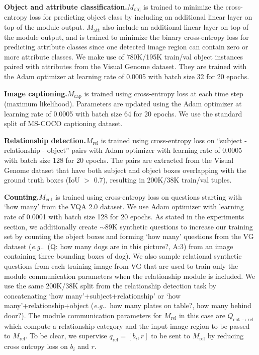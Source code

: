 \documentclass{article}
\makeatletter
\def\Mobj{M_\mathrm{obj}}
\def\Matt{M_\mathrm{att}}
\def\Mrel{M_\mathrm{rel}}
\def\Mcnt{M_\mathrm{cnt}}
\def\Mcap{M_\mathrm{cap}}
\DeclareRobustCommand\onedot{\futurelet\@let@token\@onedot}
\def\@onedot{\ifx\@let@token.\else.\null\fi\xspace}
\def\eg{\emph{e.g}\onedot} \def\Eg{\emph{E.g}\onedot}
\makeatother
\begin{document}
\textbf{Object and attribute classification.}$\Mobj$ is trained to minimize the cross-entropy loss for predicting object class by including an additional linear layer on top of the module output.
$\Matt$ also include an additional linear layer on top of the module output, and is trained to minimize the binary cross-entropy loss for predicting attribute classes since one detected image region can contain zero or more attribute classes. We make use of 780K/195K train/val object instances paired with attributes from the Visual Genome dataset.
They are trained with the Adam optimizer at learning rate of 0.0005 with batch size 32 for 20 epochs.

\textbf{Image captioning.}$\Mcap$ is trained using cross-entropy loss at each time step (maximum likelihood).
Parameters are updated using the Adam optimizer at learning rate of 0.0005 with batch size 64 for 20 epochs.
We use the standard split of MS-COCO captioning dataset.

\textbf{Relationship detection.}$\Mrel$ is trained using cross-entropy loss on ``subject - relationship - object'' pairs with Adam optimizer with learning rate of 0.0005 with batch size 128 for 20 epochs. The pairs are extracted from the Visual Genome dataset that have both subject and object boxes overlapping with the ground truth boxes (IoU $>$ 0.7), resulting in 200K/38K train/val tuples.

\textbf{Counting.}$\Mcnt$ is trained using cross-entropy loss on questions starting with `how many' from the VQA 2.0 dataset. We use Adam optimizer with learning rate of 0.0001 with batch size 128 for 20 epochs.
As stated in the experiments section, we additionally create $\sim$89K synthetic questions to increase our training set by counting the object boxes and forming `how many' questions from the VG dataset (\eg~(Q: how many dogs are in this picture?, A:3) from an image containing three bounding boxes of dog).
We also sample relational synthetic questions from each training image from VG that are used to train only the module communication parameters when the relationship module is included.
We use the same 200K/38K split from the relationship detection task by concatenating `how many'+subject+relationship' or `how many'+relationship+object (\eg~how many plates on table?, how many behind door?).
The module communication parameters for $\Mrel$ in this case are $Q_{\mathrm{cnt}\rightarrow\mathrm{rel}}$ which compute a relationship category and the input image region to be passed to $\Mrel$.
To be clear, we supervise $q_\mathrm{rel}=[b_i,r]$ to be sent to $\Mrel$ by reducing cross entropy loss on $b_i$ and $r$.
\end{document}
